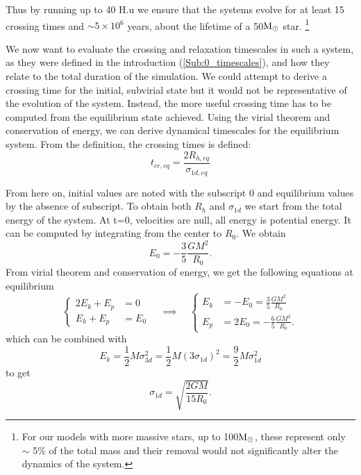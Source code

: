 Thus by running up to 40 H.u we ensure that the systems evolve for at least 15 crossing times and $ \sim  5 \times 10^6 $ years, about the lifetime of a 50${\textrm{M}_\odot}$ star. \footnote{For our models with more massive stars, up to 100${\textrm{M}_\odot}$, these represent only $\sim$ 5\% of the total mass and their removal would not significantly alter the dynamics of the system.}

We now want to evaluate the crossing and relaxation timescales in such a system, as they were defined in the introduction (\ref{Sub:0_timescales}), and how they relate to the total duration of the simulation. We could attempt to derive a crossing time for the initial, subvirial state but it would not be representative of the evolution of the system. Instead, the more useful crossing time has to be computed from the equilibrium state achieved. Using the virial theorem and conservation of energy, we can derive dynamical timescales for the equilibrium system. From the definition, the crossing times is defined:
\begin{equation}
\label{Eq:3_tcr}
t_{cr,eq} = \frac{2 R_{h,eq}}{\sigma_{1d,eq}}
\end{equation}

From here on, initial values are noted with the subscript 0 and equilibrium values by the absence of subscript. To obtain both $R_{h}$ and $\sigma_{1d}$ we start from the total energy of the system. At t=0, velocities are null, all energy is potential energy. It can be computed by integrating from the center to $R_0$. We obtain
\begin{equation}
E_0 = - \frac{3}{5} \frac{G M^2}{R_0}.
\end{equation}
From virial theorem and conservation of energy, we get the following equations at equilibrium
\begin{equation}
\label{Eq:3_energies}
\begin{cases}
2 E_k + E_p &=0\\
E_k + E_p &= E_0
\end{cases} 
\quad
\implies
\quad
\begin{cases}
E_k &= -E_0 = \frac{3}{5} \frac{G M^2}{R_0}\\
E_p &= 2 E_0 = - \frac{6}{5} \frac{G M^2}{R_0}.
\end{cases}
\end{equation}
which can be combined with
\begin{equation}
E_k = \frac{1}{2} M \sigma_{3d}^2 = \frac{1}{2} M (3 \sigma_{1d} )^2 = \frac{9}{2} M \sigma_{1d}^2
\end{equation}
to get
\begin{equation}
\sigma_{1d} = \sqrt{\frac{2 G M}{15 R_0}}.
\end{equation}

